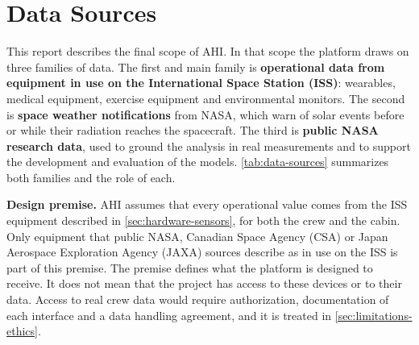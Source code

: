 \section{Data Sources}
\label{sec:data-sources}

This report describes the final scope of AHI. In that scope the platform draws on three families of data. The first and main family is \textbf{operational data from equipment in use on the International Space Station (ISS)}: wearables, medical equipment, exercise equipment and environmental monitors. The second is \textbf{space weather notifications} from NASA, which warn of solar events before or while their radiation reaches the spacecraft. The third is \textbf{public NASA research data}, used to ground the analysis in real measurements and to support the development and evaluation of the models. \ref{tab:data-sources} summarizes both families and the role of each.

\medskip\noindent\textbf{Design premise.} AHI assumes that every operational value comes from the ISS equipment described in \ref{sec:hardware-sensors}, for both the crew and the cabin. Only equipment that public NASA, Canadian Space Agency (CSA) or Japan Aerospace Exploration Agency (JAXA) sources describe as in use on the ISS is part of this premise. The premise defines what the platform is designed to receive. It does not mean that the project has access to these devices or to their data. Access to real crew data would require authorization, documentation of each interface and a data handling agreement, and it is treated in \ref{sec:limitations-ethics}.

